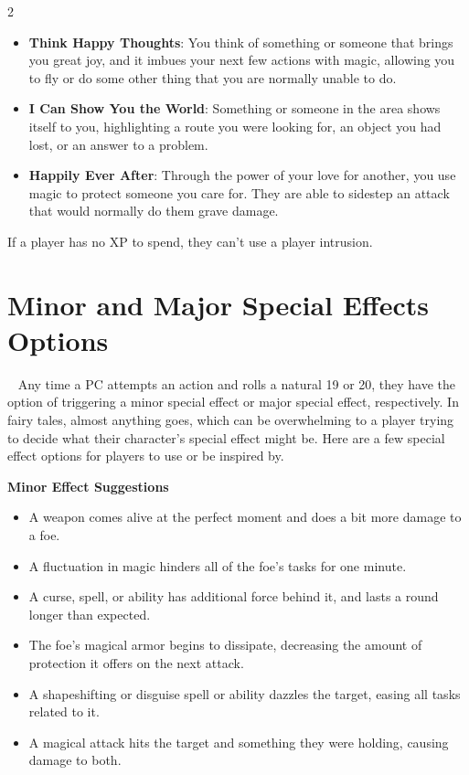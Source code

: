 \begin{multicols}{2}
\begin{itemize}
\item \textbf{Think Happy Thoughts}: You think of something or someone that brings you great joy, and it imbues your next few actions with magic, allowing you to fly or do some other thing that you are normally unable to do.
\item \textbf{I Can Show You the World}: Something or someone in the area shows itself to you, highlighting a route you were looking for, an object you had lost, or an answer to a problem.
\item \textbf{Happily Ever After}: Through the power of your love for another, you use magic to protect someone you care for. They are able to sidestep an attack that would normally do them grave damage.
\end{itemize}

If a player has no XP to spend, they can’t use a player intrusion.

\section{Minor and Major Special Effects Options}
 
Any time a PC attempts an action and rolls a natural 19 or 20, they have the option of triggering a minor special effect or major special effect, respectively. In fairy tales, almost anything goes, which can be overwhelming to a player trying to decide what their character’s special effect might be. Here are a few special effect options for players to use or be inspired by.

\textbf{Minor Effect Suggestions}
\begin{itemize}
\item A weapon comes alive at the perfect moment and does a bit more damage to a foe.
\item A fluctuation in magic hinders all of the foe’s tasks for one minute.
\item A curse, spell, or ability has additional force behind it, and lasts a round longer than expected.
\item The foe’s magical armor begins to dissipate, decreasing the amount of protection it offers on the next attack.
\item A shapeshifting or disguise spell or ability dazzles the target, easing all tasks related to it.
\item A magical attack hits the target and something they were holding, causing damage to both.
\end{itemize}


\end{multicols}
